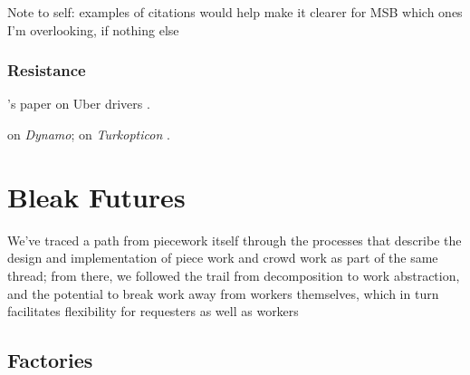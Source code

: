 \documentclass{sigchi}
\begin{document}
Note to self: examples of citations would help make it clearer for MSB which ones I'm overlooking,
if nothing else

\upshape


\subsubsection{Resistance}

\citeauthor{uberAlgorithm}'s paper on Uber drivers
\cite{uberAlgorithm}.

\citeauthor{dynamo} on \textit{Dynamo};
\citeauthor{turkopticon} on \textit{Turkopticon}
\cite{turkopticon,dynamo}.







\section{Bleak Futures}
We've traced a path from piecework itself through
the processes that describe the design and implementation of piece work and crowd work as part of the same thread;
from there, we followed the trail from decomposition to work abstraction,
and the potential to break work away from workers themselves,
which in turn facilitates flexibility for requesters as well as workers



\subsection{Factories}\label{sec:Factorization}
\end{document}
